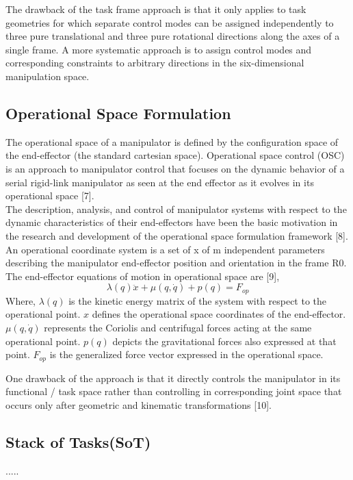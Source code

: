 The drawback of the task frame approach is that it only applies to task geometries for which separate control modes can be assigned independently to three pure translational and three pure rotational directions along the axes of a single frame. A more systematic approach is to assign control modes and corresponding constraints to arbitrary directions in the six-dimensional manipulation space.

\subsection{Operational Space Formulation}
The operational space of a manipulator is defined by the configuration space of the end-effector (the standard cartesian space). Operational space control (OSC) is an approach to manipulator control that focuses on the dynamic behavior of a serial rigid-link manipulator as seen at the end effector as it evolves in its operational space [7]. \\ The description, analysis, and control of manipulator systems with respect to the dynamic characteristics of their end-effectors have been the basic motivation in the research and development of the operational space formulation framework [8]. \\ An operational coordinate system is a set of x of m independent parameters describing the manipulator end-effector position and orientation in the frame R0. The end-effector equations of motion in operational space are [9],\\
\textbf{$$ \lambda(q) \ddot{x} + \mu (q, \dot q) + p(q) = F_{op} $$}
Where, $\lambda (q)$ is the kinetic energy matrix of the system with respect to the operational point. $x$ defines the operational space coordinates of the end-effector.\\	
$\mu (q, \dot q)$ represents the Coriolis and centrifugal forces acting at the same operational point. $p(q)$ depicts the gravitational forces also expressed at that point.	$F_{op}$ is the generalized force vector expressed in the operational space.


One drawback of the approach is that it directly controls the manipulator in its functional / task space rather than controlling in corresponding joint space that occurs only after geometric and kinematic transformations [10].

\subsection{Stack of Tasks(SoT)}{.....}

